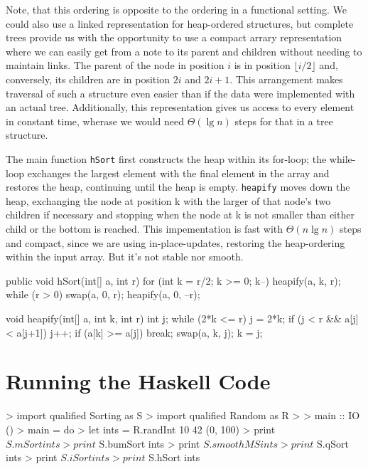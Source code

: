 Note, that this ordering is opposite to the ordering in a functional setting.
We could also use a linked representation for heap-ordered structures, but complete trees provide us with the opportunity to use a compact arrary representation where we can easily get from a note to its parent and children without needing to maintain links.
The parent of the node in position $i$ is in position $\lfloor i/2 \rfloor$ and, conversely, its children are in position $2i$ and $2i+1$.
This arrangement makes traversal of such a structure even easier than if the data were implemented with an actual tree.
Additionally, this representation gives us access to every element in constant time, wherase we would need $\Theta(\lg n)$ steps for that in a tree structure.

\begin{impl}
The main function \texttt{hSort} first constructs the heap within its for-loop; the while-loop exchanges the largest element with the final element in the array and restores the heap, continuing until the heap is empty.
\texttt{heapify} moves down the heap, exchanging the node at position k with the larger of that node's two children if necessary and stopping when the node at k is not smaller than either child or the bottom is reached.
This impementation is fast with $\Theta(n \lg n)$ steps and compact, since we are using in-place-updates, restoring the heap-ordering within the input array. But it's not stable nor smooth.
\end{impl}

\begin{javacode}
public void hSort(int[] a, int r) {
    for (int k = r/2; k >= 0; k--)
        heapify(a, k, r);
    while (r > 0) {
        swap(a, 0, r);
        heapify(a, 0, --r);
    }
}

void heapify(int[] a, int k, int r) {
    int j;
    while (2*k <= r) {
        j = 2*k;
        if (j < r && a[j] < a[j+1]) j++;
        if (a[k] >= a[j]) break;
        swap(a, k, j);
        k = j;
    }
}
\end{javacode}

\section{Running the Haskell Code}

\begin{haskellcode}

> import qualified Sorting as S
> import qualified Random as R
> 
> main :: IO ()
> main = do
>   let ints = R.randInt 10 42 (0, 100)
>   print $ S.mSort ints
>   print $ S.bumSort ints
>   print $ S.smoothMS ints
>   print $ S.qSort ints
>   print $ S.iSort ints
>   print $ S.hSort ints

\end{haskellcode}
